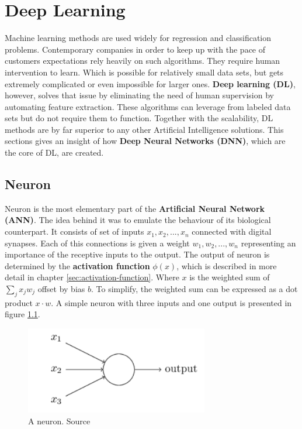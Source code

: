 \chapter{Deep Learning}
\label{cha:dl}

Machine learning methods are used widely for regression and classification problems. Contemporary companies in order to keep up with the pace of customers expectations rely heavily on such algorithms. They require human intervention to learn. Which is possible for relatively small data sets, but gets extremely complicated or even impossible for larger ones. \textbf{Deep learning (DL)}, however, solves that issue by eliminating the need of human supervision by automating feature extraction. These algorithms can leverage from labeled data sets but do not require them to function. Together with the scalability, DL methods are by far superior to any other Artificial Intelligence solutions. This sections gives an insight of how \textbf{Deep Neural Networks (DNN)}, which are the core of DL, are created.


\section{Neuron}
\label{sec:neuron}

Neuron is the most elementary part of the \textbf{Artificial Neural Network (ANN)}. The idea behind it was to emulate the behaviour of its biological counterpart. It consists of set of inputs $x_1, x_2, ..., x_n$ connected with digital synapses. Each of this connections is given a weight $w_1, w_2, ..., w_n$ representing an importance of the receptive inputs to the output. The output of neuron is determined by the \textbf{activation function} $\phi(x)$, which is described in more detail in chapter \ref{sec:activation-function}. Where $x$ is the weighted sum of $\sum_j {x_j}{w_j}$ offset by bias $b$. To simplify, the weighted sum can be expressed as a dot product $x \cdot w$.
A simple neuron with three inputs and one output is presented in figure \ref{fig:neuron}.

\begin{figure}[h]
    \centering
    \includegraphics[width=8cm]{img/Perceptron.png}
    \caption{A neuron. Source \cite{NNandDL}}
    \label{fig:neuron}
\end{figure}

